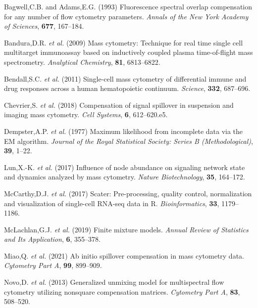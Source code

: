\documentclass[
]{article}
\newlength{\cslhangindent}
\newenvironment{CSLReferences}[2] %
 {\begin{list}{}{%
  \setlength{\itemindent}{0pt}
  \setlength{\leftmargin}{0pt}
  \setlength{\parsep}{0pt}
  \ifodd #1
   \setlength{\leftmargin}{\cslhangindent}
   \setlength{\itemindent}{-1\cslhangindent}
  \fi
  \setlength{\itemsep}{#2\baselineskip}}}
 {\end{list}}
\begin{document}
\label{refs}
\begin{CSLReferences}{1}{0}
Bagwell,C.B. and Adams,E.G. (1993) Fluorescence spectral overlap compensation for any number of flow cytometry parameters. \emph{Annals of the New York Academy of Sciences}, \textbf{677}, 167--184.

Bandura,D.R. \emph{et al.} (2009) Mass cytometry: Technique for real time single cell multitarget immunoassay based on inductively coupled plasma time-of-flight mass spectrometry. \emph{Analytical Chemistry}, \textbf{81}, 6813--6822.

Bendall,S.C. \emph{et al.} (2011) Single-cell mass cytometry of differential immune and drug responses across a human hematopoietic continuum. \emph{Science}, \textbf{332}, 687--696.

Chevrier,S. \emph{et al.} (2018) Compensation of signal spillover in suspension and imaging mass cytometry. \emph{Cell Systems}, \textbf{6}, 612--620.e5.

Dempster,A.P. \emph{et al.} (1977) Maximum likelihood from incomplete data via the {EM} algorithm. \emph{Journal of the Royal Statistical Society: Series B (Methodological)}, \textbf{39}, 1--22.

Lun,X.-K. \emph{et al.} (2017) Influence of node abundance on signaling network state and dynamics analyzed by mass cytometry. \emph{Nature Biotechnology}, \textbf{35}, 164--172.

McCarthy,D.J. \emph{et al.} (2017) Scater: Pre-processing, quality control, normalization and visualization of single-cell {RNA}-seq data in {R}. \emph{Bioinformatics}, \textbf{33}, 1179--1186.

McLachlan,G.J. \emph{et al.} (2019) Finite mixture models. \emph{Annual Review of Statistics and Its Application}, \textbf{6}, 355--378.

Miao,Q. \emph{et al.} (2021) Ab initio spillover compensation in mass cytometry data. \emph{Cytometry Part A}, \textbf{99}, 899--909.

Novo,D. \emph{et al.} (2013) Generalized unmixing model for multispectral flow cytometry utilizing nonsquare compensation matrices. \emph{Cytometry Part A}, \textbf{83}, 508--520.


\end{CSLReferences}
\end{document}
